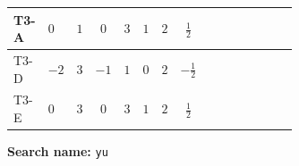\documentclass[8pt]{article}
\begin{document}
\begin{landscape}
\begin{longtable}{@{}llcccccc >{\raggedright\arraybackslash}p{0.21\linewidth} >{\raggedright\arraybackslash}p{0.21\linewidth} >{\raggedright\arraybackslash}p{0.21\linewidth}@{}}
\midrule
T3-A & $0$ & $1$ & $0$ & $3$ & $1$ & $2$ & $\frac{1}{2}$ & \scriptsize\adjustbox{max width=\linewidth}{$\begin{gathered} -\frac{3}{2} (\left({Y_d}\,\left({Y_d}\right)^{\dagger}\,{Y_u}\right)_{ij}-\left({Y_u}\,\left({Y_u}\right)^{\dagger}\,{Y_u}\right)_{ij})\end{gathered}$} & \scriptsize\adjustbox{max width=\linewidth}{$\begin{gathered} -\frac{9}{4} {g_2}^2 \left({Y_u}\right)_{ij}\end{gathered}$} & \scriptsize\adjustbox{max width=\linewidth}{$\begin{gathered} -8 {g_3}^2 \left({Y_u}\right)_{ij}\end{gathered}$} \\
\midrule
T3-D & $-2$ & $3$ & $-1$ & $1$ & $0$ & $2$ & $-\frac{1}{2}$ & \scriptsize\adjustbox{max width=\linewidth}{$\begin{gathered} -\frac{3}{2} (\left({Y_d}\,\left({Y_d}\right)^{\dagger}\,{Y_u}\right)_{ij}-\left({Y_u}\,\left({Y_u}\right)^{\dagger}\,{Y_u}\right)_{ij})\end{gathered}$} & \scriptsize\adjustbox{max width=\linewidth}{$\begin{gathered} -\frac{9}{4} {g_2}^2 \left({Y_u}\right)_{ij}\end{gathered}$} & \scriptsize\adjustbox{max width=\linewidth}{$\begin{gathered} -8 {g_3}^2 \left({Y_u}\right)_{ij}\end{gathered}$} \\
\midrule
T3-E & $0$ & $3$ & $0$ & $3$ & $1$ & $2$ & $\frac{1}{2}$ & \scriptsize\adjustbox{max width=\linewidth}{$\begin{gathered} -\frac{3}{2} (\left({Y_d}\,\left({Y_d}\right)^{\dagger}\,{Y_u}\right)_{ij}-\left({Y_u}\,\left({Y_u}\right)^{\dagger}\,{Y_u}\right)_{ij})\end{gathered}$} & \scriptsize\adjustbox{max width=\linewidth}{$\begin{gathered} -\frac{9}{4} {g_2}^2 \left({Y_u}\right)_{ij}\end{gathered}$} & \scriptsize\adjustbox{max width=\linewidth}{$\begin{gathered} -8 {g_3}^2 \left({Y_u}\right)_{ij}\end{gathered}$} \\
\midrule
\bottomrule
\end{longtable}
\clearpage
\noindent\textbf{Search name: }\texttt{yu}\par\smallskip

\end{landscape}
\end{document}
